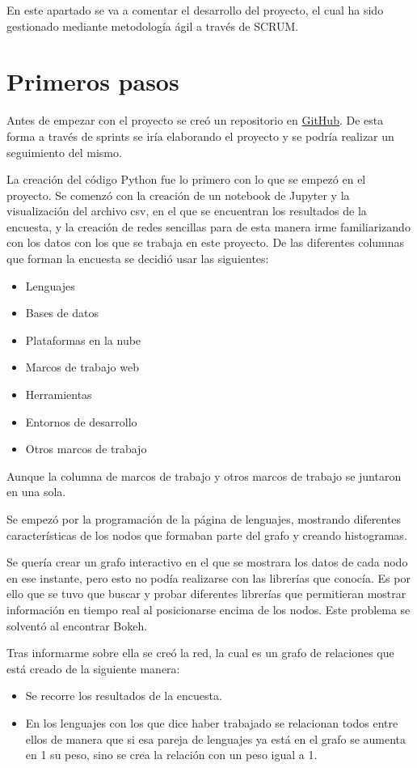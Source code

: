 
En este apartado se va a comentar el desarrollo del proyecto, el cual ha sido gestionado mediante metodología ágil a través de SCRUM.

\section{Primeros pasos}
Antes de empezar con el proyecto se creó un repositorio en \href{https://github.com/eca1001/TFG}{GitHub}. De esta forma a través de sprints se iría elaborando el proyecto y se podría realizar un seguimiento del mismo.

La creación del código Python fue lo primero con lo que se empezó en el proyecto. Se comenzó con la creación de un notebook de Jupyter y la visualización del archivo csv, en el que se encuentran los resultados de la encuesta, y la creación de redes sencillas para de esta manera irme familiarizando con los datos con los que se trabaja en este proyecto. De las diferentes columnas que forman la encuesta se decidió usar las siguientes:

\begin{itemize}
    \item Lenguajes
    \item Bases de datos
    \item Plataformas en la nube
    \item Marcos de trabajo web
    \item Herramientas
    \item Entornos de desarrollo
    \item Otros marcos de trabajo
\end{itemize}

Aunque la columna de marcos de trabajo y otros marcos de trabajo se juntaron en una sola.

Se empezó por la programación de la página de lenguajes, mostrando diferentes características de los nodos que formaban parte del grafo y creando histogramas. 

Se quería crear un grafo interactivo en el que se mostrara los datos de cada nodo en ese instante, pero esto no podía realizarse con las librerías que conocía. Es por ello que se tuvo que buscar y probar diferentes librerías que permitieran mostrar información en tiempo real al posicionarse encima de los nodos. Este problema se solventó al encontrar Bokeh.

Tras informarme sobre ella se creó la red, la cual es un grafo de relaciones que está creado de la siguiente manera:
\begin{itemize}
    \item Se recorre los resultados de la encuesta.
    \item En los lenguajes con los que dice haber trabajado se relacionan todos entre ellos de manera que si esa pareja de lenguajes ya está en el grafo se aumenta en 1 su peso, sino se crea la relación con un peso igual a 1.
\end{itemize}

